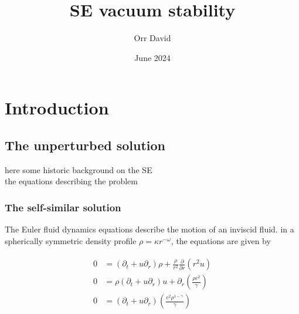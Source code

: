 \documentclass{article}
\title{SE vacuum stability}
\author{Orr David}
\date{June 2024}
\begin{document}
\maketitle

\section{Introduction}
\subsection{The unperturbed solution}
here some historic background on the SE\\
the equations describing the problem

\subsubsection{The self-similar solution}
The Euler fluid dynamics equations describe the motion of an inviscid fluid. in a spherically symmetric density profile $\rho = \kappa r^{-\omega}$, the equations are given by

\begin{align}
    \begin{split}
        0	&=\left(\partial_{t}+u\partial_{r}\right)\rho+\frac{\rho}{r^{2}}\frac{\partial}{\partial r}\left(r^{2}u\right)\\
        0	&=\rho\left(\partial_{t}+u\partial_{r}\right)u+\partial_{r}\left(\frac{\rho c^{2}}{\gamma}\right)\\
        0	&=\left(\partial_{t}+u\partial_{r}\right)\left(\frac{c^{2}\rho^{1-\gamma}}{\gamma}\right)            
    \end{split}
\end{align}
\end{document}
